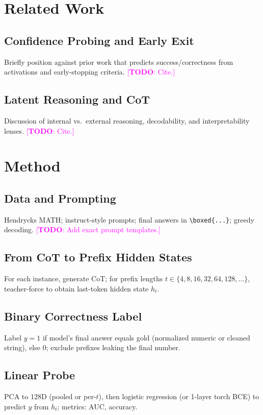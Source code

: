 \documentclass[10pt,a4paper,twocolumn]{article}
\newcommand{\todo}[1]{\textcolor{magenta}{[\textbf{TODO}: #1]}}
\begin{document}
\section{Related Work}
\label{sec:related}
\subsection{Confidence Probing and Early Exit}
Briefly position against prior work that predicts success/correctness from activations and early-stopping criteria. \todo{Cite.}

\subsection{Latent Reasoning and CoT}
Discussion of internal vs.\ external reasoning, decodability, and interpretability lenses. \todo{Cite.}

\section{Method}
\label{sec:method}
\subsection{Data and Prompting}
Hendrycks MATH; instruct-style prompts; final answers in \verb|\boxed{...}|; greedy decoding. \todo{Add exact prompt templates.}

\subsection{From CoT to Prefix Hidden States}
For each instance, generate CoT; for prefix lengths $t\in\{4,8,16,32,64,128,\dots\}$, teacher-force to obtain last-token hidden state $h_t$.

\subsection{Binary Correctness Label}
Label $y{=}1$ if model's final answer equals gold (normalized numeric or cleaned string), else $0$; exclude prefixes leaking the final number.

\subsection{Linear Probe}
PCA to 128D (pooled or per-$t$), then logistic regression (or 1-layer torch BCE) to predict $y$ from $h_t$; metrics: AUC, accuracy.
\end{document}
